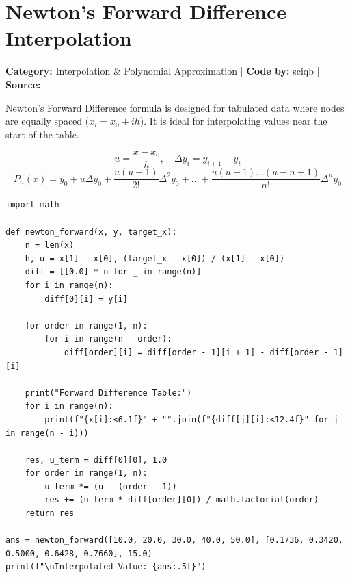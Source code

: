 \documentclass[10pt,a4paper]{report}
\begin{document}
\section{Newton's Forward Difference Interpolation}
\textbf{Category:} \textcolor{secondary}{Interpolation \& Polynomial Approximation} \quad | \quad \textbf{Code by:} \textcolor{secondary}{sciqb} \quad | \quad \textbf{Source:} \texttt{}

Newton's Forward Difference formula is designed for tabulated data where nodes are equally spaced ($x_i = x_0 + i h$). It is ideal for interpolating values near the start of the table.

\begin{tcolorbox}[colback=theorybg,colframe=theoryframe,title=\textbf{Mathematical Theory \& Formulation},boxrule=1pt,arc=2mm]
\[
u = \frac{x - x_0}{h}, \quad \Delta y_i = y_{i+1} - y_i
\]
\[
P_n(x) = y_0 + u \Delta y_0 + \frac{u(u-1)}{2!} \Delta^2 y_0 + \dots + \frac{u(u-1)\dots(u-n+1)}{n!} \Delta^n y_0
\]
\end{tcolorbox}

\begin{tcolorbox}[colback=codebg,colframe=secondary,title=\textbf{Python Implementation (Step-by-Step Functions)},boxrule=1pt,arc=2mm]
\begin{lstlisting}[style=python_detailed]
import math

def newton_forward(x, y, target_x):
    n = len(x)
    h, u = x[1] - x[0], (target_x - x[0]) / (x[1] - x[0])
    diff = [[0.0] * n for _ in range(n)]
    for i in range(n):
        diff[0][i] = y[i]

    for order in range(1, n):
        for i in range(n - order):
            diff[order][i] = diff[order - 1][i + 1] - diff[order - 1][i]

    print("Forward Difference Table:")
    for i in range(n):
        print(f"{x[i]:<6.1f}" + "".join(f"{diff[j][i]:<12.4f}" for j in range(n - i)))

    res, u_term = diff[0][0], 1.0
    for order in range(1, n):
        u_term *= (u - (order - 1))
        res += (u_term * diff[order][0]) / math.factorial(order)
    return res

ans = newton_forward([10.0, 20.0, 30.0, 40.0, 50.0], [0.1736, 0.3420, 0.5000, 0.6428, 0.7660], 15.0)
print(f"\nInterpolated Value: {ans:.5f}")


\end{lstlisting}
\end{tcolorbox}
\end{document}

